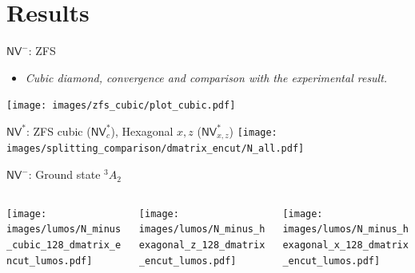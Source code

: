 \documentclass[]{beamer}
\begin{document}

\section{Results} %

\begin{frame}{$ \mathsf{NV}^{-} $: ZFS }
  \begin{itemize}
    \item
      \textit{Cubic diamond, convergence and comparison with the experimental result.}
  \end{itemize}
  \texttt{[image: images/zfs\_cubic/plot\_cubic.pdf]}
\end{frame}

\begin{frame}{$ \mathsf{NV}^{*} $: ZFS cubic ($ \mathsf{NV}^{*}_{c} $), Hexagonal $ x,z $ ($ \mathsf{NV}_{x,z}^{*} $)   }
  \texttt{[image: images/splitting\_comparison/dmatrix\_encut/N\_all.pdf]}
\end{frame}

\begin{frame}{ $ \mathsf{NV}^{-} $: Ground state $ ^3A_{2} $ }
  \begin{center}
    \begin{columns}
      \begin{column}{0.3\textwidth}
        \texttt{[image: images/lumos/N\_minus\_cubic\_128\_dmatrix\_encut\_lumos.pdf]}
      \end{column}
      \begin{column}{0.3\textwidth}
        \texttt{[image: images/lumos/N\_minus\_hexagonal\_z\_128\_dmatrix\_encut\_lumos.pdf]}
      \end{column}
      \begin{column}{0.3\textwidth}
        \texttt{[image: images/lumos/N\_minus\_hexagonal\_x\_128\_dmatrix\_encut\_lumos.pdf]}
      \end{column}
    \end{columns}
  \end{center}
\end{frame}
\end{document}
